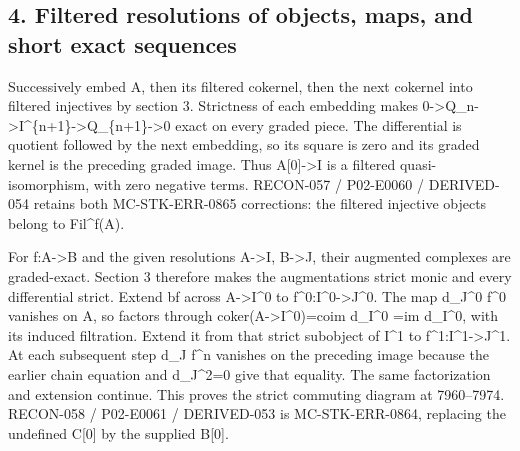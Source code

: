\subsection{\texorpdfstring{4. Filtered resolutions of objects,\allowbreak{} maps,\allowbreak{} and short exact sequences}{4. Filtered resolutions of   and short exact sequences}}\label{proofs-7589-8350-filtered-resolutions-of-objects-maps-and-short-exact-sequences}

Successively embed A,\allowbreak{} then its filtered cokernel,\allowbreak{} then the next cokernel into filtered injectives by section 3. Strictness of each embedding makes 0\allowbreak{}->Q\_\allowbreak{}n\allowbreak{}->I\textasciicircum{}\{n\allowbreak{}+1\}\allowbreak{}->Q\_\allowbreak{}\{n\allowbreak{}+1\}\allowbreak{}->0 exact on every graded piece. The differential is quotient followed by the next embedding,\allowbreak{} so its square is zero and its graded kernel is the preceding graded image. Thus A[0]\allowbreak{}\allowbreak{}->I is a filtered quasi-isomorphism,\allowbreak{} with zero negative terms. RECON-057 /\allowbreak{} P02-E0060 /\allowbreak{} DERIVED-054 retains both MC-STK-ERR-0865 corrections:\allowbreak{} the filtered injective objects belong to Fil\textasciicircum{}f(A)\allowbreak{}.

For f:\allowbreak{}A\allowbreak{}->B and the given resolutions A\allowbreak{}->I,\allowbreak{} B\allowbreak{}->J,\allowbreak{} their augmented complexes are graded-exact. Section 3 therefore makes the augmentations strict monic and every differential strict. Extend bf across A\allowbreak{}->I\textasciicircum{}0 to f\textasciicircum{}0:\allowbreak{}I\textasciicircum{}0\allowbreak{}->J\textasciicircum{}0. The map d\_\allowbreak{}J\textasciicircum{}0 f\^{}0 vanishes on A,\allowbreak{} so factors through coker(A\allowbreak{}->I\textasciicircum{}0)\allowbreak{}\allowbreak{}=coim d\_\allowbreak{}I\textasciicircum{}0 \allowbreak{}=im d\_\allowbreak{}I\textasciicircum{}0,\allowbreak{} with its induced filtration. Extend it from that strict subobject of I\^{}1 to f\textasciicircum{}1:\allowbreak{}I\textasciicircum{}1\allowbreak{}->J\textasciicircum{}1. At each subsequent step d\_\allowbreak{}J f\^{}n vanishes on the preceding image because the earlier chain equation and d\_\allowbreak{}J\textasciicircum{}2\allowbreak{}=0 give that equality. The same factorization and extension continue. This proves the strict commuting diagram at 7960–\allowbreak{}7974. RECON-058 /\allowbreak{} P02-E0061 /\allowbreak{} DERIVED-053 is MC-STK-ERR-0864,\allowbreak{} replacing the undefined C[0]\allowbreak{} by the supplied B[0]\allowbreak{}.


